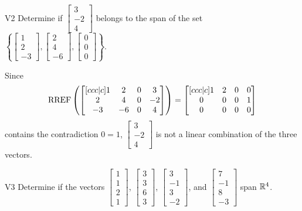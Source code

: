 \documentclass{sbgLAsemi}
\begin{document}
\begin{problem}{V2}
  Determine if
  \(\begin{bmatrix} 3 \\ -2 \\ 4 \end{bmatrix}\)
  belongs to the span of the set
  \(\left\{
    \begin{bmatrix} 1 \\ 2 \\ -3 \end{bmatrix},
    \begin{bmatrix} 2 \\ 4 \\ -6 \end{bmatrix},
    \begin{bmatrix} 0 \\ 0 \\ 0 \end{bmatrix}
    \right\}
  \).
\end{problem}
\begin{solution}
  Since
  \[
    \operatorname{RREF}\left(
      \begin{bmatrix}[ccc|c]
        1 & 2 & 0 & 3 \\
        2 & 4 & 0 & -2 \\
        -3 & -6 & 0 & 4
      \end{bmatrix}
    \right) =
    \begin{bmatrix}[ccc|c]
      1 & 2 & 0 & 0 \\
      0 & 0 & 0 & 1 \\
      0 & 0 & 0 & 0
    \end{bmatrix}
  \]
  contains the contradiction \(0=1\),
  \(\begin{bmatrix} 3 \\ -2 \\ 4 \end{bmatrix}\) is
  not a linear combination of the three vectors.
\end{solution}
\begin{problem}{V3}
Determine if the vectors $\begin{bmatrix} 1 \\ 1 \\ 2 \\1 \end{bmatrix}$, $\begin{bmatrix} 3 \\ 3 \\ 6 \\ 3 \end{bmatrix}$, $\begin{bmatrix}3 \\ -1 \\ 3 \\ -2\end{bmatrix}$, and $\begin{bmatrix} 7 \\ -1 \\ 8 \\ -3 \end{bmatrix}$  span $\mathbb{R}^4$.
\end{problem}
\end{document}
